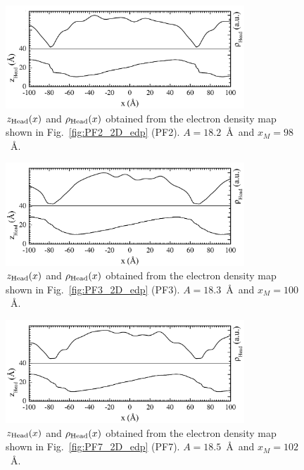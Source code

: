 \begin{figure}[htbp]
  \centering
  \includegraphics[width=0.8\textwidth]{figures/ripple/LAXS/PF2_headgroup}
  \caption[$\zhead(x)$ and $\rhohead(x)$ obtained from the electron density map
  shown in Fig.~\ref{fig:PF2_2D_edp} (PF2)]
  {$\zhead(x)$ and $\rhohead(x)$ obtained from the electron density map
  shown in Fig.~\ref{fig:PF2_2D_edp} (PF2).
  $A = 18.2$~\AA\ and $x_M = 98$~\AA.}
  \label{fig:PF2_headgroup}
\end{figure}

\begin{figure}[htbp]
  \centering
  \includegraphics[width=0.8\textwidth]{figures/ripple/LAXS/PF3_headgroup}
  \caption[$\zhead(x)$ and $\rhohead(x)$ obtained from the electron density map
  shown in Fig.~\ref{fig:PF3_2D_edp} (PF3)]
  {$\zhead(x)$ and $\rhohead(x)$ obtained from the electron density map
  shown in Fig.~\ref{fig:PF3_2D_edp} (PF3).
  $A = 18.3$~\AA\ and $x_M = 100$~\AA.}
  \label{fig:PF3_headgroup}
\end{figure}

\begin{figure}[htbp]
  \centering
  \includegraphics[width=0.8\textwidth]{figures/ripple/LAXS/PF7_headgroup}
  \caption[$\zhead(x)$ and $\rhohead(x)$ obtained from the electron density map
  shown in Fig.~\ref{fig:PF7_2D_edp} (PF7)]
  {$\zhead(x)$ and $\rhohead(x)$ obtained from the electron density map
  shown in Fig.~\ref{fig:PF7_2D_edp} (PF7).
  $A = 18.5$~\AA\ and $x_M = 102$~\AA.}
  \label{fig:PF7_headgroup}
\end{figure}

